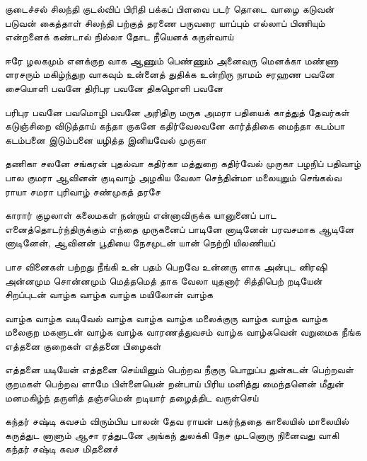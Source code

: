 \begin{flushleft}
{        குடைச்சல் சிலந்தி குடல்விப் பிரிதி
        பக்கப் பிளவை படர் தொடை வாழை
        கடுவன் படுவன் கைத்தாள் சிலந்தி
        பற்குத் தரணை பருவரை யாப்பும்
        எல்லாப் பிணியும் என்றனைக் கண்டால்
        நில்லா தோட நீயெனக் கருள்வாய்
                                        
        ஈரே ழலகமும் எனக்குற வாக
        ஆணும் பெண்ணும் அனைவரு மெனக்கா
        மண்ணா ளரசரும் மகிழ்ந்துற வாகவும்
        உன்னைத் துதிக்க உன்றிரு நாமம்
        சரஹண பவனே சையொளி பவனே
        திரிபுர பவனே திகழொளி பவனே
                                        
        பரிபுர பவனே பவமொழி பவனே
        அரிதிரு மருக அமரா பதியைக்
        காத்துத் தேவர்கள் கடுஞ்சிறை விடுத்தாய்
        கந்தா குகனே கதிர்வேலவனே
        கார்த்திகை மைந்தா கடம்பா கடம்பனை
        இடும்பனை யழித்த இனியவேல் முருகா
                                        
        தணிகா சலனே சங்கரன் புதல்வா
        கதிர்கா மத்துறை கதிர்வேல் முருகா
        பழநிப் பதிவாழ் பால குமரா
        ஆவினன் குடிவாழ் அழகிய வேலா
        செந்தின்மா மலையுறும் செங்கல்வ ராயா
        சமரா புரிவாழ் சண்முகத் தரசே
                                        
        காரார் குழலாள் கலைமகள் நன்றாய்
        என்னாவிருக்க யானுனைப் பாட
        எனைத்தொடர்ந்திருக்கும் எந்தை முருகனைப்
        பாடினே னாடினேன் பரவசமாக
        ஆடினே னாடினேன், ஆவினன் பூதியை
        நேசமுடன் யான் நெற்றி யிலணியப்
                                        
        பாச வினைகள் பற்றது நீங்கி
        உன் பதம் பெறவே உன்னரு ளாக
        அன்புட னிரஷி அன்னமும சொன்னமும்
        மெத்தமெத் தாக வேலா யுதனார்
        சித்திபெற் றடியேன் சிறப்புடன் வாழ்க
        வாழ்க வாழ்க மயிலோன் வாழ்க
                                        
        வாழ்க வாழ்க வடிவேல் வாழ்க
        வாழ்க வாழ்க மலைக்குரு வாழ்க
        வாழ்க வாழ்க மலைகுற மகளுடன்
        வாழ்க வாழ்க வாரணத்துவசம்
        வாழ்க வாழ்கவென் வறுமைக நீங்க
        எத்தனை குறைகள் எத்தனை பிழைகள்
                                        
        எத்தனை யடியேன் எத்தனை செய்யினும்
        பெற்றவ நீகுரு பொறுப்ப துன்கடன்
        பெற்றவள் குறமகள் பெற்றவ ளாமே
        பிள்ளையென் றன்பாய் பிரிய மளித்து
        மைந்தனென் மீதுன் மனமகிழ்ந் தருளித்
        தஞ்சமென் றடியார் தழைத்திட வருள்செய்
                                        
        கந்தர் சஷ்டி கவசம் விரும்பிய
        பாலன் தேவ ராயன் பகர்ந்ததை
        காலையில் மாலையில் கருத்துட னாளும்
        ஆசா ரத்துடனே அங்கந் துலக்கி
        நேச முடனொரு நினைவது வாகி
        கந்தர் சஷ்டி கவச மிதனைச்
                                        
}
\end{flushleft}
